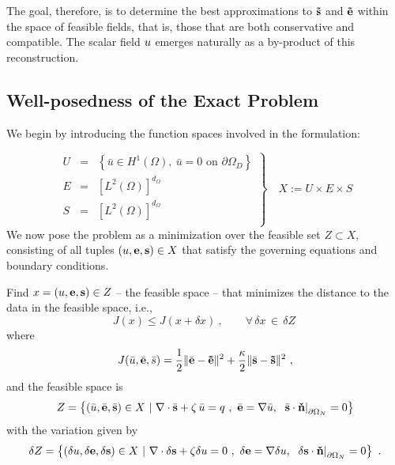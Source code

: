 The goal, therefore, is to determine the best approximations to $\mathbf{\tilde{s}}$ and $\mathbf{\tilde{e}}$ within the space of feasible fields, that is, those that are both conservative and compatible. The scalar field $u$ emerges naturally as a by-product of this reconstruction.

\subsection{Well-posedness of the Exact Problem}

We begin by introducing the function spaces involved in the formulation:

\begin{equation}
	\left.
	\begin{array}{rcl}
		U & = & \left\{ \bar{u} \in H^1(\Omega),\ \bar{u} = 0 \text{ on } \partial\Omega_D \right\} \\
		E & = & \left[ L^2(\Omega) \right]^{d_\Omega} \\
		S & = & \left[ L^2(\Omega) \right]^{d_\Omega} \\
	\end{array}
	\right \rbrace  \quad X := U \times E \times S
\end{equation}
We now pose the problem as a minimization over the feasible set $ Z \subset X $, consisting of all tuples $ (u, \mathbf{e}, \mathbf{s}) \in X $ that satisfy the governing equations and boundary conditions.
\begin{tcolorbox}[colback=black!10!white, halign = justify, boxrule=0pt]
\begin{problem*}[P1]
	Find $x= \left (u,\mathbf{e},\mathbf{s} \right) \in Z$ -- the feasible space -- that minimizes the distance to the data in the feasible space, i.e.,
	\begin{equation}
		J(x) \leq J(x+\delta x)~,\qquad \forall \,\delta x\,\in\,\delta Z~
	\end{equation}
	where 
	\begin{equation}
		J(\bar{u},\bar{\mathbf{e}},\bar{s})=\frac12 \|\bar{\mathbf{e}}-\mathbf{\tilde{e}}\|^2 + \frac{\kappa}{2} \|\bar{\mathbf{s}}-\mathbf{\tilde{s}}\|^2~,
	\end{equation}
	and the feasible space is
	\begin{equation}
		Z=\left \{ (\bar{u},\bar{\mathbf{e}},\bar{\mathbf{s}})\in X~|~\nabla \cdot \bar{\mathbf{s}} + \zeta \,\bar{u} = q~,~\bar{\mathbf{e}}=\nabla \bar{u},\,\left.~\bar{\mathbf{s}}\cdot\mathbf{\check{n}}\right |_{\partial \Omega_N}=0 \right \}
	\end{equation}
	with the variation given by
	\begin{equation}
		\delta Z=\left \{ (\delta{u},\delta{\mathbf{e}},\delta{\mathbf{s}})\in X~|~\nabla \cdot \delta{\mathbf{s}} + \zeta \delta{u} = 0~,~ \delta{\mathbf{e}}=\nabla \delta{u} ,\,\left. ~\delta{\mathbf{s}}\cdot\mathbf{\check{n}}\right |_{\partial \Omega_N}=0\right \}~.
	\end{equation}
\end{problem*}
\end{tcolorbox}

